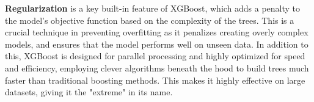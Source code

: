 	\vspace{5pt}
	\noindent \textbf{Regularization} is a key built-in feature of XGBoost, which adds a penalty to the model's objective function based on the complexity of the trees. This is a crucial technique in preventing overfitting as it penalizes creating overly complex models, and ensures that the model performs well on unseen data. In addition to this, XGBoost is designed for parallel processing and highly optimized for speed and efficiency, employing clever algorithms beneath the hood to build trees much faster than traditional boosting methods. This makes it highly effective on large datasets, giving it the "extreme" in its name.   


